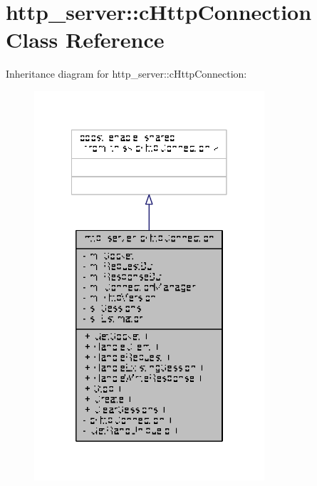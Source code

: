 \hypertarget{classhttp__server_1_1cHttpConnection}{\section{http\-\_\-server\-:\-:c\-Http\-Connection Class Reference}
\label{classhttp__server_1_1cHttpConnection}
}


Inheritance diagram for http\-\_\-server\-:\-:c\-Http\-Connection\-:
\nopagebreak
\begin{figure}[H]
\begin{center}
\leavevmode
\includegraphics[width=242pt]{classhttp__server_1_1cHttpConnection__inherit__graph}
\end{center}
\end{figure}


